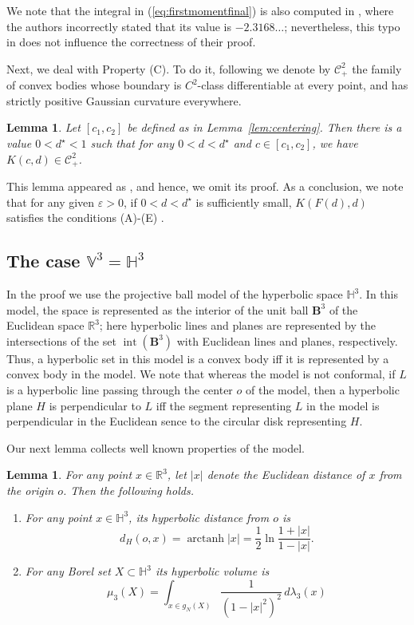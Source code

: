 \documentclass[twoside]{amsart}
\theoremstyle{plain}
\newtheorem{lemma}[theorem]{Lemma}
\theoremstyle{definition}
\numberwithin{equation}{section}
\renewcommand{\Re}{\mathbb R}
\newcommand{\B}{\mathbf{B}}
\newcommand{\HHH}{\mathbb{H}}
\newcommand{\V}{\mathbb{V}}
\DeclareMathOperator{\arctanh}{arctanh}
\DeclareMathOperator{\inter}{int}
\begin{document}
We note that the integral in (\ref{eq:firstmomentfinal}) is also computed in \cite{DLV}, where the authors incorrectly stated that its value is $-2.3168\ldots$; nevertheless, this typo in \cite{DLV} does not influence the correctness of their proof.

Next, we deal with Property (C). To do it, following \cite{Schneider} we denote by $\mathcal{C}^2_+$ the family of convex bodies whose boundary is $C^2$-class differentiable at every point, and has strictly positive Gaussian curvature everywhere.

\begin{lemma}\label{lem:convexity}
Let $[c_1,c_2]$ be defined as in Lemma~\ref{lem:centering}. Then there is a value $0 < d^{\star} < 1$ such that for any 
$0 < d < d^{\star}$ and $c \in [c_1,c_2]$, we have $K(c,d) \in \mathcal{C}^2_+$. 
\end{lemma}

This lemma appeared as \cite[Lemma 6]{DLV}, and hence, we omit its proof. As a conclusion, we note that for any given $\varepsilon > 0$, if $0 < d < d^{\star}$ is sufficiently small, $K(F(d),d)$ satisfies the conditions (A)-(E) .

\subsection{The case $\V^3 = \HHH^3$}\label{subsec:hyperbolic}

In the proof we use the projective ball model of the hyperbolic space $\HHH^3$. In this model, the space is represented as the interior of the unit ball $\B^3$ of the Euclidean space $\Re^3$; here hyperbolic lines and planes are represented by the intersections of the set $\inter (\B^3)$ with Euclidean lines and planes, respectively.
Thus, a hyperbolic set in this model is a convex body iff it is represented by a convex body in the model. We note that whereas the model is not conformal, if $L$ is a hyperbolic line passing through the center $o$ of the model, then a hyperbolic plane $H$ is perpendicular to $L$ iff the segment representing $L$ in the model is perpendicular in the Euclidean sence to the circular disk representing $H$.

Our next lemma collects well known properties of the model.

\begin{lemma}\label{lem:hypvolume}
For any point $x \in \Re^3$, let $|x|$ denote the Euclidean distance of $x$ from the origin $o$. Then the following holds.
\begin{enumerate}
\item[(i)] For any point $x \in \HHH^3$, its hyperbolic distance from $o$ is
\[
d_H(o,x)= \arctanh |x| = \frac{1}{2} \ln \frac{1+|x|}{1-|x|}.
\]
\item[(ii)] For any Borel set $X \subset \HHH^3$ its hyperbolic volume is
\[
\mu_3(X) = \int_{x \in g_N(X)} \frac{1}{\left( 1- |x|^2 \right)^2} \, d \lambda_3(x)
\]
\end{enumerate}
\end{lemma}
\end{document}

